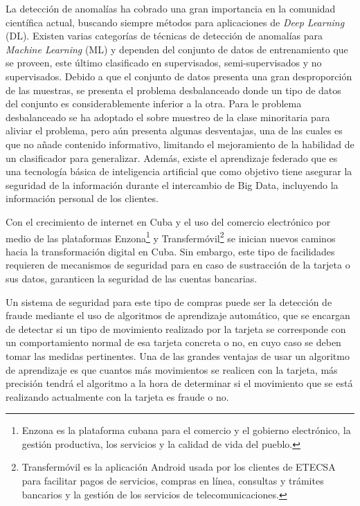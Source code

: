  La detecci\'{o}n de anomal\'{i}as ha cobrado una gran importancia en la comunidad cient\'{i}fica actual, buscando siempre m\'{e}todos para aplicaciones de \textit{Deep Learning} (DL). Existen varias categor\'{i}as de t\'{e}cnicas de detecci\'{o}n de anomal\'{i}as para \textit{Machine Learning} (ML) y dependen del conjunto de datos de entrenamiento que se proveen, este \'{u}ltimo clasificado en supervisados, semi-supervisados y no supervisados. Debido a que el conjunto de datos presenta una gran desproporci\'{o}n de las muestras, se presenta el problema desbalanceado donde un tipo de datos del conjunto es considerablemente inferior a la otra. Para le problema desbalanceado se ha adoptado el sobre muestreo de la clase minoritaria para aliviar el problema, pero a\'{u}n presenta algunas desventajas, una de las cuales es que no a\~{n}ade contenido informativo, limitando el mejoramiento de la habilidad de un clasificador para generalizar. Adem\'{a}s, existe el aprendizaje federado que es una tecnolog\'{i}a b\'{a}sica de inteligencia artificial que como objetivo tiene asegurar la seguridad de la informaci\'{o}n durante el intercambio de Big Data, incluyendo la informaci\'{o}n personal de los clientes.
 
 Con el crecimiento de internet en Cuba y el uso del comercio electr\'{o}nico por medio de las plataformas Enzona\footnote{Enzona es la plataforma cubana para el comercio y el gobierno electr\'{o}nico, la gesti\'{o}n productiva, los servicios y la calidad de vida del pueblo.}  y Transferm\'{o}vil\footnote{Transferm\'{o}vil es la aplicaci\'{o}n Android usada por los clientes de ETECSA para facilitar pagos de servicios, compras en l\'{i}nea, consultas y tr\'{a}mites bancarios y la gesti\'{o}n de los servicios de telecomunicaciones.}  se inician nuevos caminos hacia la transformaci\'{o}n digital en Cuba. Sin embargo, este tipo de facilidades requieren de mecanismos de seguridad para en caso de sustracci\'{o}n de la tarjeta o sus datos, garanticen la seguridad de las cuentas bancarias.
 
 Un sistema de seguridad para este tipo de compras puede ser la detecci\'{o}n de fraude mediante el uso de algoritmos de aprendizaje autom\'{a}tico, que se encargan de detectar si un tipo de movimiento realizado por la tarjeta se corresponde con un comportamiento normal de esa tarjeta concreta o no, en cuyo caso se deben tomar las medidas pertinentes. Una de las grandes ventajas de usar un algoritmo de aprendizaje es que cuantos m\'{a}s movimientos se realicen con la tarjeta, m\'{a}s precisi\'{o}n tendr\'{a} el algoritmo a la hora de determinar si el movimiento que se est\'{a} realizando actualmente con la tarjeta es fraude o no.
 
